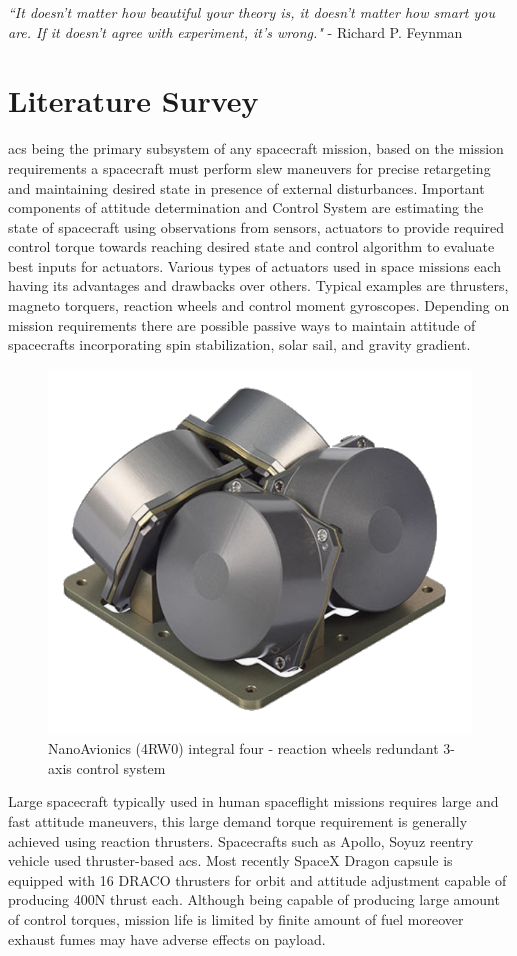 \vspace*{10px}
\begin{center}
\textit{``It doesn't matter how beautiful your theory is, it doesn't matter how smart you are. If it doesn't agree with experiment, it's wrong."} 
\flushright - Richard P. Feynman

\end{center}

\section{Literature Survey}
\acrfull{acs} being the primary subsystem of any spacecraft mission, based on the mission requirements a spacecraft must perform slew maneuvers for precise retargeting and maintaining desired state in presence of external disturbances. Important components of attitude determination and Control System are estimating the state of spacecraft using observations from sensors, actuators to provide required control torque towards reaching desired state and control algorithm to evaluate best inputs for actuators. Various types of actuators used in space missions each having its advantages and drawbacks over others. Typical examples are thrusters, magneto torquers, reaction wheels and control moment gyroscopes. Depending on mission requirements there are possible passive ways to maintain attitude of spacecrafts incorporating spin stabilization, solar sail, and gravity gradient. 
\begin{figure}[h!]
    \centering
    \includegraphics[width=0.5\linewidth]{figures/SatBus-4RW0-1-new.pdf}
    \caption{NanoAvionics (4RW0) integral four - reaction wheels redundant 3-axis control system  }
    \label{fig:na4RW0}
\end{figure}

\noindent Large spacecraft typically used in human spaceflight missions requires large and fast attitude maneuvers, this large demand torque requirement is generally achieved using reaction thrusters. Spacecrafts such as Apollo, Soyuz reentry vehicle used thruster-based \acrshort{acs}. Most recently SpaceX Dragon capsule is equipped with 16 DRACO thrusters \cite{web:SpaceXDargon} for orbit and attitude adjustment capable of producing 400N thrust each.\cite{book:SPACEX} Although being capable of producing large amount of control torques, mission life is limited by finite amount of fuel moreover exhaust fumes may have adverse effects on payload.


